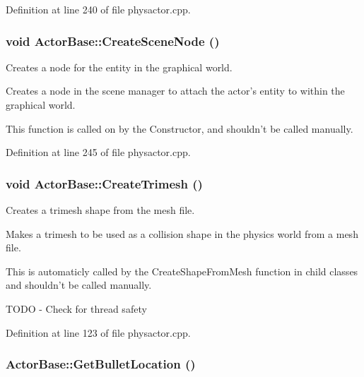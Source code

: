 Definition at line 240 of file physactor.cpp.

\hypertarget{classActorBase_a168cd57e20b2adfc5cae21627ddbae31}{
\subsubsection[{CreateSceneNode}]{\setlength{\rightskip}{0pt plus 5cm}void ActorBase::CreateSceneNode ()}}
\label{dd/d7b/classActorBase_a168cd57e20b2adfc5cae21627ddbae31}


Creates a node for the entity in the graphical world. 

Creates a node in the scene manager to attach the actor's entity to within the graphical world. \par
 This function is called on by the Constructor, and shouldn't be called manually. 

Definition at line 245 of file physactor.cpp.

\hypertarget{classActorBase_af7f0806222c79b5d5120dccefd93715e}{
\subsubsection[{CreateTrimesh}]{\setlength{\rightskip}{0pt plus 5cm}void ActorBase::CreateTrimesh ()}}
\label{dd/d7b/classActorBase_af7f0806222c79b5d5120dccefd93715e}


Creates a trimesh shape from the mesh file. 

Makes a trimesh to be used as a collision shape in the physics world from a mesh file. \par
 This is automaticly called by the CreateShapeFromMesh function in child classes and shouldn't be called manually. 

TODO -\/ Check for thread safety 



Definition at line 123 of file physactor.cpp.

\hypertarget{classActorBase_ae84ff822d2f962360bf291bb2c88eb3e}{
\subsubsection[{GetBulletLocation}]{ ActorBase::GetBulletLocation ()}}
\label{dd/d7b/classActorBase_ae84ff822d2f962360bf291bb2c88eb3e}


